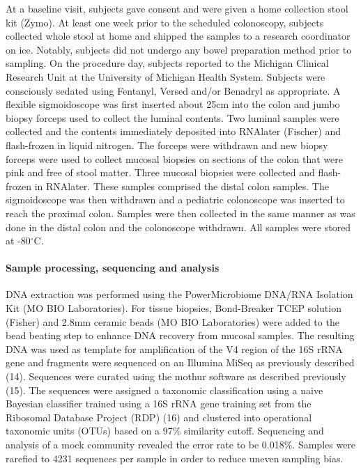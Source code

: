 \documentclass[12pt,]{article}
\let\oldparagraph\paragraph
\renewcommand{\paragraph}[1]{\oldparagraph{#1}\mbox{}}
\begin{document}
At a baseline visit, subjects gave consent and were given a home
collection stool kit (Zymo). At least one week prior to the scheduled
colonoscopy, subjects collected whole stool at home and shipped the
samples to a research coordinator on ice. Notably, subjects did not
undergo any bowel preparation method prior to sampling. On the procedure
day, subjects reported to the Michigan Clinical Research Unit at the
University of Michigan Health System. Subjects were consciously sedated
using Fentanyl, Versed and/or Benadryl as appropriate. A flexible
sigmoidoscope was first inserted about 25cm into the colon and jumbo
biopsy forceps used to collect the luminal contents. Two luminal samples
were collected and the contents immediately deposited into RNAlater
(Fischer) and flash-frozen in liquid nitrogen. The forceps were
withdrawn and new biopsy forceps were used to collect mucosal biopsies
on sections of the colon that were pink and free of stool matter. Three
mucosal biopsies were collected and flash-frozen in RNAlater. These
samples comprised the distal colon samples. The sigmoidoscope was then
withdrawn and a pediatric colonoscope was inserted to reach the proximal
colon. Samples were then collected in the same manner as was done in the
distal colon and the colonoscope withdrawn. All samples were stored at
-80\(^\circ\)C.

\paragraph{Sample processing, sequencing and
analysis}\label{sample-processing-sequencing-and-analysis}

DNA extraction was performed using the PowerMicrobiome DNA/RNA Isolation
Kit (MO BIO Laboratories). For tissue biopsies, Bond-Breaker TCEP
solution (Fisher) and 2.8mm ceramic beads (MO BIO Laboratories) were
added to the bead beating step to enhance DNA recovery from mucosal
samples. The resulting DNA was used as template for amplification of the
V4 region of the 16S rRNA gene and fragments were sequenced on an
Illumina MiSeq as previously described (14). Sequences were curated
using the mothur software as described previously (15). The sequences
were assigned a taxonomic classification using a naive Bayesian
classifier trained using a 16S rRNA gene training set from the Ribosomal
Database Project (RDP) (16) and clustered into operational taxonomic
units (OTUs) based on a 97\% similarity cutoff. Sequencing and analysis
of a mock community revealed the error rate to be 0.018\%. Samples were
rarefied to 4231 sequences per sample in order to reduce uneven sampling
bias.
\end{document}
